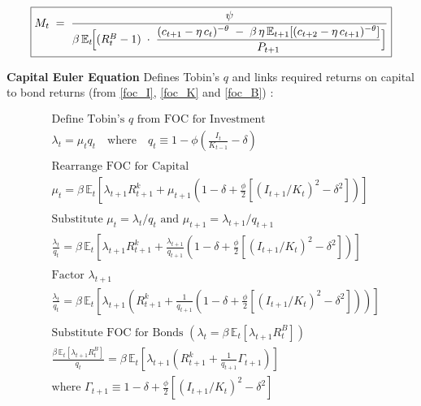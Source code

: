 \documentclass[11pt,preprint]{elsarticle}
\numberwithin{equation}{section}
\numberwithin{figure}{section}
\numberwithin{table}{section}
\begin{document}
\begin{equation}\label{money_demand_app}
\boxed{
  M_t
  \;=\;
  \frac{\psi}
       {\beta\,\mathbb{E}_t\!\Bigl[
         (R_t^B - 1)
         \;\cdot\;
         \dfrac{(c_{t+1} - \eta\,c_t)^{-\theta}
               \;-\;
               \beta\,\eta\,\mathbb{E}_{t+1}[(c_{t+2} - \eta\,c_{t+1})^{-\theta}]}
              {P_{t+1}}
       \Bigr]}
}
\end{equation}

\textbf{Capital Euler Equation } Defines Tobin's \(q\) and links
required returns on capital to bond returns (from \eqref{foc_I},
\eqref{foc_K} and \eqref{foc_B}) :

\begin{align*}
& \text{Define Tobin's } q \text{ from FOC for Investment} \\
& \lambda_t = \mu_t q_t \quad \text{where} \quad q_t \equiv 1 - \phi\left(\tfrac{I_t}{K_{t-1}} - \delta\right) \\
& \\
& \text{Rearrange FOC for Capital} \\
& \mu_t = \beta\,\mathbb{E}_t\!\left[ \lambda_{t+1}R_{t+1}^k + \mu_{t+1}\!\left(1-\delta + \tfrac{\phi}{2}\left[(I_{t+1}/K_t)^2 - \delta^2\right]\right) \right] \\
& \\
& \text{Substitute } \mu_t = \lambda_t / q_t \text{ and } \mu_{t+1} = \lambda_{t+1} / q_{t+1} \\
& \frac{\lambda_t}{q_t} = \beta\,\mathbb{E}_t\!\left[ \lambda_{t+1}R_{t+1}^k + \frac{\lambda_{t+1}}{q_{t+1}}\left(1-\delta + \tfrac{\phi}{2}\left[(I_{t+1}/K_t)^2 - \delta^2\right]\right) \right] \\
& \\
& \text{Factor } \lambda_{t+1} \\
& \frac{\lambda_t}{q_t} = \beta\,\mathbb{E}_t\!\left[ \lambda_{t+1} \left( R_{t+1}^k + \frac{1}{q_{t+1}}\left(1-\delta + \tfrac{\phi}{2}\left[(I_{t+1}/K_t)^2 - \delta^2\right]\right) \right) \right] \\
& \\
& \text{Substitute FOC for Bonds } (\lambda_t = \beta\,\mathbb{E}_t[\lambda_{t+1}R_t^B]) \\
& \frac{\beta\,\mathbb{E}_t[\lambda_{t+1}R_t^B]}{q_t} = \beta\,\mathbb{E}_t\!\left[ \lambda_{t+1} \left( R_{t+1}^k + \frac{1}{q_{t+1}}\Gamma_{t+1} \right) \right] \\
& \text{where } \Gamma_{t+1} \equiv 1-\delta + \tfrac{\phi}{2}\left[(I_{t+1}/K_t)^2 - \delta^2\right]
\end{align*}
\end{document}
